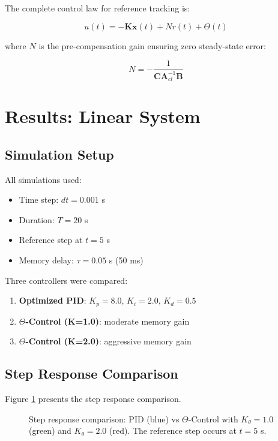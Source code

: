 \documentclass[12pt,a4paper]{article}
\begin{document}
The complete control law for reference tracking is:

\begin{equation}
u(t) = -\mathbf{K}\mathbf{x}(t) + N r(t) + \Theta(t)
\label{eq:complete_law}
\end{equation}

where $N$ is the pre-compensation gain ensuring zero steady-state 
error:

\begin{equation}
N = -\frac{1}{\mathbf{C}\mathbf{A}_{cl}^{-1}\mathbf{B}}
\label{eq:n_gain}
\end{equation}

\section{Results: Linear System}

\subsection{Simulation Setup}

All simulations used:
\begin{itemize}
    \item Time step: $dt = 0.001$ s
    \item Duration: $T = 20$ s
    \item Reference step at $t = 5$ s
    \item Memory delay: $\tau = 0.05$ s (50 ms)
\end{itemize}

Three controllers were compared:
\begin{enumerate}
    \item \textbf{Optimized PID}: $K_p=8.0$, $K_i=2.0$, $K_d=0.5$
    \item \textbf{$\Theta$-Control (K=1.0)}: moderate memory gain
    \item \textbf{$\Theta$-Control (K=2.0)}: aggressive memory gain
\end{enumerate}

\subsection{Step Response Comparison}

Figure \ref{fig:main_results} presents the step response comparison.

\begin{figure}[H]
\centering
\caption{Step response comparison: PID (blue) vs $\Theta$-Control 
with $K_\theta=1.0$ (green) and $K_\theta=2.0$ (red). The reference 
step occurs at $t=5$ s.}
\label{fig:main_results}
\end{figure}
\end{document}
